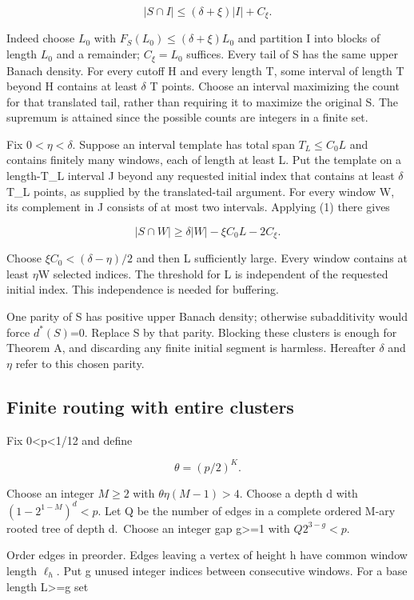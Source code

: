 \documentclass[
  11pt,
]{article}
\theoremstyle{remark}\newtheorem{remark}[theorem]{Remark}
\begin{document}
\[
|S\cap I|\le(\delta+\xi)|I|+C_\xi.\tag{1}
\]

Indeed choose \(L_0\) with \(F_S(L_0)\le(\delta+\xi)L_0\) and partition
I into blocks of length \(L_0\) and a remainder; \(C_\xi=L_0\) suffices.
Every tail of S has the same upper Banach density. For every cutoff H
and every length T, some interval of length T beyond H contains at least
\(\delta\) T points. Choose an interval maximizing the count for that
translated tail, rather than requiring it to maximize the original S.
The supremum is attained since the possible counts are integers in a
finite set.

Fix \(0<\eta<\delta\). Suppose an interval template has total span
\(T_L\le C_0L\) and contains finitely many windows, each of length at
least L. Put the template on a length-T\_L interval J beyond any
requested initial index that contains at least \(\delta\) T\_L points,
as supplied by the translated-tail argument. For every window W, its
complement in J consists of at most two intervals. Applying (1) there
gives

\[
|S\cap W|\ge\delta|W|-\xi C_0L-2C_\xi.
\]

Choose \(\xi C_0<(\delta-\eta)/2\) and then L sufficiently large. Every
window contains at least \(\eta\)\textbar W\textbar{} selected indices.
The threshold for L is independent of the requested initial index. This
independence is needed for buffering.

One parity of S has positive upper Banach density; otherwise
subadditivity would force \(d^*(S)\)=0. Replace S by that parity.
Blocking these clusters is enough for Theorem A, and discarding any
finite initial segment is harmless. Hereafter \(\delta\) and \(\eta\)
refer to this chosen parity.

\subsection{Finite routing with entire
clusters}\label{finite-routing-with-entire-clusters}

Fix 0\textless p\textless1/12 and define

\[
\theta=(p/2)^K.
\]

Choose an integer \(M\ge2\) with \(\theta\eta(M-1)>4\). Choose a depth d
with \((1-2^{1-M})^d<p\). Let Q be the number of edges in a complete
ordered M-ary rooted tree of depth d.~Choose an integer gap
g\textgreater=1 with \(Q2^{3-g}<p\).

Order edges in preorder. Edges leaving a vertex of height h have common
window length \(\ell_h\). Put g unused integer indices between
consecutive windows. For a base length L\textgreater=g set
\end{document}
